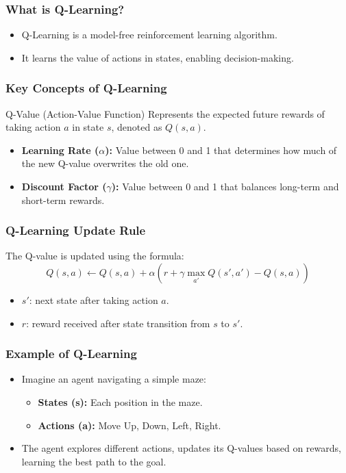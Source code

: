 \documentclass{beamer}
\begin{document}
\begin{frame}[fragile]
    \frametitle{What is Q-Learning?}
    \begin{itemize}
        \item Q-Learning is a model-free reinforcement learning algorithm.
        \item It learns the value of actions in states, enabling decision-making.
    \end{itemize}
\end{frame}

\begin{frame}[fragile]
    \frametitle{Key Concepts of Q-Learning}
    \begin{block}{Q-Value (Action-Value Function)}
        Represents the expected future rewards of taking action \( a \) in state \( s \), denoted as \( Q(s, a) \).
    \end{block}

    \begin{itemize}
        \item \textbf{Learning Rate (\( \alpha \)):} Value between 0 and 1 that determines how much of the new Q-value overwrites the old one.
        \item \textbf{Discount Factor (\( \gamma \)):} Value between 0 and 1 that balances long-term and short-term rewards.
    \end{itemize}
\end{frame}

\begin{frame}[fragile]
    \frametitle{Q-Learning Update Rule}
    The Q-value is updated using the formula:
    \begin{equation}
        Q(s, a) \leftarrow Q(s, a) + \alpha \left( r + \gamma \max_{a'} Q(s', a') - Q(s, a) \right)
    \end{equation}
    \begin{itemize}
        \item \( s' \): next state after taking action \( a \).
        \item \( r \): reward received after state transition from \( s \) to \( s' \).
    \end{itemize}
\end{frame}

\begin{frame}[fragile]
    \frametitle{Example of Q-Learning}
    \begin{itemize}
        \item Imagine an agent navigating a simple maze:
        \begin{itemize}
            \item \textbf{States (s):} Each position in the maze.
            \item \textbf{Actions (a):} Move Up, Down, Left, Right.
        \end{itemize}
        \item The agent explores different actions, updates its Q-values based on rewards, learning the best path to the goal.
    \end{itemize}
\end{frame}
\end{document}
